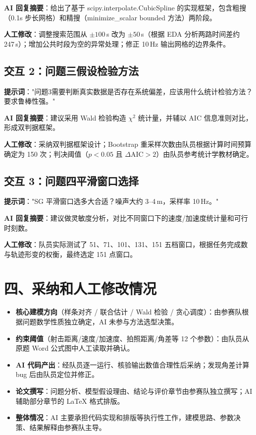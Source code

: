 \documentclass[a4paper, 12pt]{ctexart}
\begin{document}
\textbf{AI 回复摘要}：给出了基于 scipy.interpolate.CubicSpline 的实现框架，包含粗搜（0.1s 步长网格）和精搜（minimize\_scalar bounded 方法）两阶段。

\textbf{人工修改}：调整搜索范围从 $\pm 100$\,s 改为 $\pm 50$\,s（根据 EDA 分析两路时间差约 247\,s）；增加公共时段为空的异常处理；修正 10\,Hz 输出网格的边界条件。

\subsection*{交互 2：问题三假设检验方法}

\textbf{提示词}："问题3需要判断真实数据是否存在系统偏差，应该用什么统计检验方法？要求鲁棒性强。"

\textbf{AI 回复摘要}：建议采用 Wald 检验构造 $\chi^2$ 统计量，并辅以 AIC 信息准则对比，形成双判据框架。

\textbf{人工修改}：采纳双判据框架设计；Bootstrap 重采样次数由队员根据计算时间预算确定为 150 次；判决阈值（$p < 0.05$ 且 $\Delta\text{AIC} > 2$）由队员参考统计学教材确定。

\subsection*{交互 3：问题四平滑窗口选择}

\textbf{提示词}："SG 平滑窗口选多大合适？噪声大约 3--4\,m，采样率 10\,Hz。"

\textbf{AI 回复摘要}：建议做灵敏度分析，对比不同窗口下的速度/加速度统计量和可行时刻数。

\textbf{人工修改}：队员实际测试了 51、71、101、131、151 五档窗口，根据任务完成数与轨迹形变的权衡，最终选定 151 点窗口。

\section*{四、采纳和人工修改情况}

\begin{itemize}[leftmargin=2em]
\item \textbf{核心建模方向}（样条对齐 / 联合估计 / Wald 检验 / 贪心调度）：由参赛队根据问题数学性质独立确定，AI 未参与方法选型决策。
\item \textbf{约束阈值}（射击距离/速度/加速度、拍照距离/角差等 12 个参数）：由队员从原题 Word 公式图中人工读取并确认。
\item \textbf{AI 代码产出}：经队员逐一运行、核验输出数值合理性后采纳；发现角差计算 bug 后由队员定位并修正。
\item \textbf{论文撰写}：问题分析、模型假设理由、结论与评价章节由参赛队独立撰写；AI 辅助部分章节的 LaTeX 格式排版。
\item \textbf{整体情况}：AI 主要承担代码实现和排版等执行性工作，建模思路、参数决策、结果解释由参赛队主导。
\end{itemize}
\end{document}
